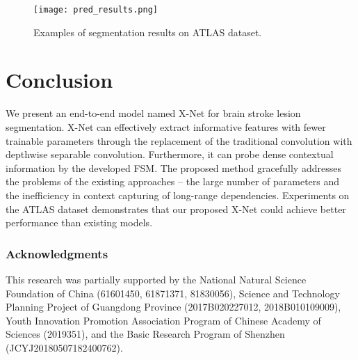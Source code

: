 \documentclass[runningheads]{llncs}
\begin{document}
\begin{figure}
	\texttt{[image: pred\_results.png]}
	\caption{Examples of segmentation results on ATLAS dataset.} \label{pred_results}
\end{figure}

\section{Conclusion}
We present an end-to-end model named X-Net for brain stroke lesion segmentation. X-Net can effectively extract informative features with fewer trainable parameters through the replacement of the traditional convolution with depthwise separable convolution. Furthermore, it can probe dense contextual information by the developed FSM. The proposed method gracefully addresses the problems of the existing approaches – the large number of parameters and the inefficiency in context capturing of long-range dependencies. Experiments on the ATLAS dataset demonstrates that our proposed X-Net could achieve better performance than existing models. 

\subsubsection{Acknowledgments} 
This research was partially supported by the National Natural Science Foundation of China (61601450, 61871371, 81830056), Science and Technology Planning Project of Guangdong Province (2017B020227012, 2018B010109009), Youth Innovation Promotion Association Program of Chinese Academy of Sciences (2019351), and the Basic Research Program of Shenzhen (JCYJ20180507182400762).
\end{document}

